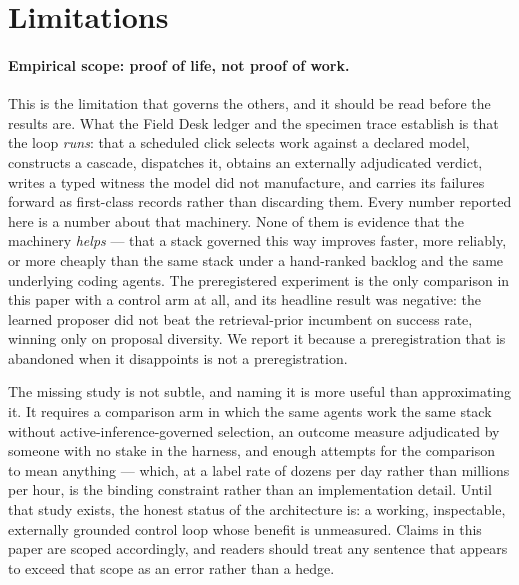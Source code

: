 \section{Limitations}\label{sec:limitations}

\paragraph{Empirical scope: proof of life, not proof of work.}  This is the
limitation that governs the others, and it should be read before the results
are.  What the Field Desk ledger and the specimen trace establish is that the
loop \emph{runs}: that a scheduled click selects work against a declared model,
constructs a cascade, dispatches it, obtains an externally adjudicated verdict,
writes a typed witness the model did not manufacture, and carries its failures
forward as first-class records rather than discarding them.  Every number
reported here is a number about that machinery.  None of them is evidence that
the machinery \emph{helps} --- that a stack governed this way improves faster,
more reliably, or more cheaply than the same stack under a hand-ranked backlog
and the same underlying coding agents.  The preregistered experiment is the only
comparison in this paper with a control arm at all, and its headline result was
negative: the learned proposer did not beat the retrieval-prior incumbent on
success rate, winning only on proposal diversity.  We report it because a
preregistration that is abandoned when it disappoints is not a preregistration.

The missing study is not subtle, and naming it is more useful than approximating
it.  It requires a comparison arm in which the same agents work the same stack
without active-inference-governed selection, an outcome measure adjudicated by
someone with no stake in the harness, and enough attempts for the comparison to
mean anything --- which, at a label rate of dozens per day rather than millions
per hour, is the binding constraint rather than an implementation detail.  Until
that study exists, the honest status of the architecture is: a working,
inspectable, externally grounded control loop whose benefit is unmeasured.
Claims in this paper are scoped accordingly, and readers should treat any
sentence that appears to exceed that scope as an error rather than a hedge.

